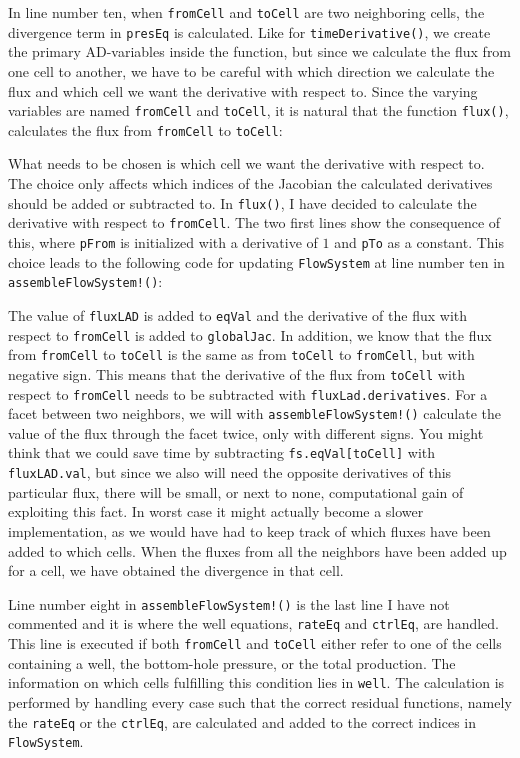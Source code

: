 In line number ten, when \texttt{fromCell} and \texttt{toCell} are two neighboring cells, the divergence term in \texttt{presEq} is calculated. Like for \texttt{timeDerivative()}, we create the primary AD-variables inside the function, but since we calculate the flux from one cell to another, we have to be careful with which direction we calculate the flux and which cell we want the derivative with respect to. Since the varying variables are named \texttt{fromCell} and \texttt{toCell}, it is natural that the function \texttt{flux()}, calculates the flux from \texttt{fromCell} to \texttt{toCell}:

What needs to be chosen is which cell we want the derivative with respect to. The choice only affects which indices of the Jacobian the calculated derivatives should be added or subtracted to. In \texttt{flux()}, I have decided to calculate the derivative with respect to \texttt{fromCell}. The two first lines show the consequence of this, where \texttt{pFrom} is initialized with a derivative of $1$ and \texttt{pTo} as a constant. This choice leads to the following code for updating \texttt{FlowSystem} at line number ten in \texttt{assembleFlowSystem!()}:

The value of \texttt{fluxLAD} is added to \texttt{eqVal} and the derivative of the flux with respect to \texttt{fromCell} is added to \texttt{globalJac}. In addition, we know that the flux from \texttt{fromCell} to \texttt{toCell} is the same as from \texttt{toCell} to \texttt{fromCell}, but with negative sign. This means that the derivative of the flux from \texttt{toCell} with respect to \texttt{fromCell} needs to be subtracted with \texttt{fluxLad.derivatives}. For a facet between two neighbors, we will with \texttt{assembleFlowSystem!()} calculate the value of the flux through the facet twice, only with different signs. You might think that we could save time by subtracting \texttt{fs.eqVal[toCell]} with \texttt{fluxLAD.val}, but since we also will need the opposite derivatives of this particular flux, there will be small, or next to none, computational gain of exploiting this fact. In worst case it might actually become a slower implementation, as we would have had to keep track of which fluxes have been added to which cells. When the fluxes from all the neighbors have been added up for a cell, we have obtained the divergence in that cell. 

Line number eight in \texttt{assembleFlowSystem!()} is the last line I have not commented and it is where the well equations, \texttt{rateEq} and \texttt{ctrlEq}, are handled. This line is executed if both \texttt{fromCell} and \texttt{toCell} either refer to one of the cells containing a well, the bottom-hole pressure, or the total production. The information on which cells fulfilling this condition lies in \texttt{well}. The calculation is performed by handling every case such that the correct residual functions, namely the \texttt{rateEq} or the \texttt{ctrlEq}, are calculated and added to the correct indices in \texttt{FlowSystem}.

